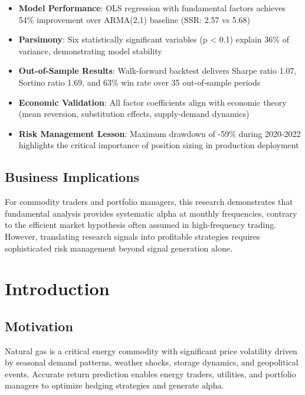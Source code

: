 \documentclass[12pt,a4paper]{article}
\begin{document}
\begin{itemize}[leftmargin=*]
    \item \textbf{Model Performance}: OLS regression with fundamental factors achieves 54\% improvement over ARMA(2,1) baseline (SSR: 2.57 vs 5.68)

    \item \textbf{Parsimony}: Six statistically significant variables (p < 0.1) explain 36\% of variance, demonstrating model stability

    \item \textbf{Out-of-Sample Results}: Walk-forward backtest delivers Sharpe ratio 1.07, Sortino ratio 1.69, and 63\% win rate over 35 out-of-sample periods

    \item \textbf{Economic Validation}: All factor coefficients align with economic theory (mean reversion, substitution effects, supply-demand dynamics)

    \item \textbf{Risk Management Lesson}: Maximum drawdown of -59\% during 2020-2022 highlights the critical importance of position sizing in production deployment
\end{itemize}

\subsection{Business Implications}

For commodity traders and portfolio managers, this research demonstrates that fundamental analysis provides systematic alpha at monthly frequencies, contrary to the efficient market hypothesis often assumed in high-frequency trading. However, translating research signals into profitable strategies requires sophisticated risk management beyond signal generation alone.

\newpage
\section{Introduction}

\subsection{Motivation}

Natural gas is a critical energy commodity with significant price volatility driven by seasonal demand patterns, weather shocks, storage dynamics, and geopolitical events. Accurate return prediction enables energy traders, utilities, and portfolio managers to optimize hedging strategies and generate alpha.
\end{document}
